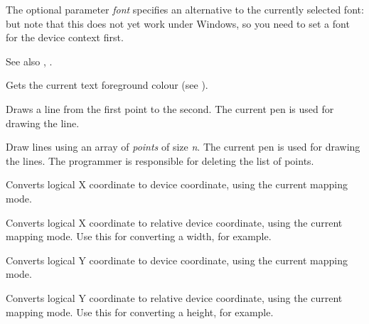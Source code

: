 The optional parameter {\it font} specifies an alternative
to the currently selected font: but note that this does not
yet work under Windows, so you need to set a font for
the device context first.

See also , .



Gets the current text foreground colour (see ).



Draws a line from the first point to the second. The current pen is
used for drawing the line.



Draw lines using an array of {\it points} of size {\it n}. The current pen is used
for drawing the lines.  The programmer is responsible for deleting the list of points.



Converts logical X coordinate to device coordinate, using the current
mapping mode.



Converts logical X coordinate to relative device coordinate, using the current
mapping mode. Use this for converting a width, for example.



Converts logical Y coordinate to device coordinate, using the current
mapping mode.



Converts logical Y coordinate to relative device coordinate, using the current
mapping mode. Use this for converting a height, for example.

